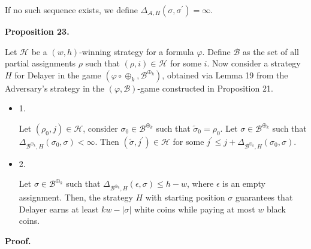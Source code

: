 \documentclass[10pt,a4paper]{article}
\begin{document}
If no such sequence exists, we define $\Delta_{\mathcal{A},H}(\sigma,\sigma^{\prime})=\infty$.\par




\par\medskip\noindent\textbf{
Proposition 23.
}\par



Let $\mathcal{H}$ be a $(w,h)$-winning strategy for a formula $\varphi$.
Define $\mathcal{B}$ as the set of all partial assignments $\rho$ such that $(\rho,i)\in\mathcal{H}$ for some $i$.
Now consider a strategy $H$ for Delayer in the game $(\varphi\circ\oplus_{k},\mathcal{B}^{\oplus_{k}})$, obtained via Lemma 19 from the Adversary’s strategy in the $(\varphi,\mathcal{B})$-game constructed in Proposition 21.\par


\begin{itemize}


\item 
1. 


Let $(\rho_{0},j)\in\mathcal{H}$, consider $\sigma_{0}\in\mathcal{B}^{\oplus_{k}}$ such that
$\tilde{\sigma}_{0}=\rho_{0}$. Let $\sigma\in\mathcal{B}^{\oplus_{k}}$ such that
$\Delta_{\mathcal{B}^{\oplus_{k}},H}(\sigma_{0},\sigma)<\infty$.
Then $(\tilde{\sigma},j^{\prime})\in\mathcal{H}$ for some
$j^{\prime}\leq j+\Delta_{\mathcal{B}^{\oplus_{k}},H}(\sigma_{0},\sigma)$.\par





\item 
2. 


Let $\sigma\in\mathcal{B}^{\oplus_{k}}$ such that $\Delta_{\mathcal{B}^{\oplus_{k}},H}(\epsilon,\sigma)\leq h-w$, where $\epsilon$ is an empty assignment. Then, the strategy $H$ with starting position $\sigma$ guarantees that Delayer earns at least $kw-|\sigma|$ white coins while paying at most $w$ black coins.\par





\end{itemize}



\par\medskip\noindent\textbf{Proof.}\par
\end{document}
